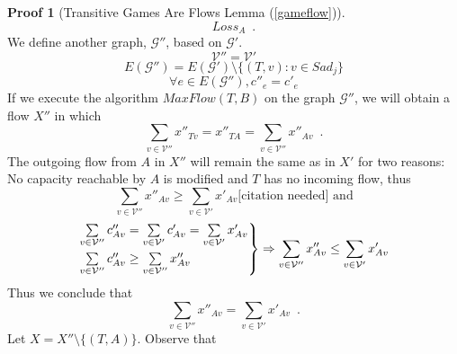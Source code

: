 \documentclass[11pt]{llncs}
\theoremstyle{definition}
\newtheorem{sepproof}{Proof}
\begin{document}
\begin{sepproof}[Transitive Games Are Flows Lemma (\ref{gameflow})]
\begin{equation}
          Loss_A \enspace.
       \end{equation}
       We define another graph, $\mathcal{G}''$, based on $\mathcal{G}'$.
       \begin{equation}
          \mathcal{V}'' = \mathcal{V}'
       \end{equation}
       \begin{equation}
          E(\mathcal{G}'') = E(\mathcal{G}') \setminus \{(T, v) : v \in Sad_j\}
       \end{equation}
       \begin{equation}
          \forall e \in E(\mathcal{G}''), c''_e = c'_e
       \end{equation}
       If we execute the algorithm $MaxFlow(T, B)$ on the graph $\mathcal{G}''$, we will obtain a flow $X''$ in which
       \begin{equation}
          \sum\limits_{v \in \mathcal{V}''}x''_{Tv} = x''_{TA} = \sum\limits_{v \in \mathcal{V}''}x''_{Av} \enspace.
       \end{equation}
       The outgoing flow from $A$ in $X''$ will remain the same as in $X'$ for two reasons: \\
       No capacity reachable by $A$ is modified and $T$ has no incoming flow, thus
       \begin{equation}
          \sum\limits_{v \in \mathcal{V}''}x''_{Av} \geq \sum\limits_{v \in \mathcal{V}'}x'_{Av} \mbox{[citation needed] and}
       \end{equation}
       \begin{equation}
          \begin{rcases}
             \sum\limits_{v \in \mathcal{V}''}c''_{Av} = \sum\limits_{v \in \mathcal{V}'}c'_{Av} = \sum\limits_{v \in
             \mathcal{V}'}x'_{Av} \\
             \sum\limits_{v \in \mathcal{V}''}c''_{Av} \geq \sum\limits_{v \in \mathcal{V}''}x''_{Av}
          \end{rcases}
          \Rightarrow \sum\limits_{v \in \mathcal{V}''}x''_{Av} \leq \sum\limits_{v \in \mathcal{V}'}x'_{Av}
       \end{equation}
       Thus we conclude that
       \begin{equation}
       \label{primeequaldoubleprime}
          \sum\limits_{v \in \mathcal{V}''}x''_{Av} = \sum\limits_{v \in \mathcal{V}'}x'_{Av} \enspace.
       \end{equation}
       Let $X = X'' \setminus \{(T, A)\}$. Observe that
       \begin{equation}

\end{equation}
\end{sepproof}
\end{document}
